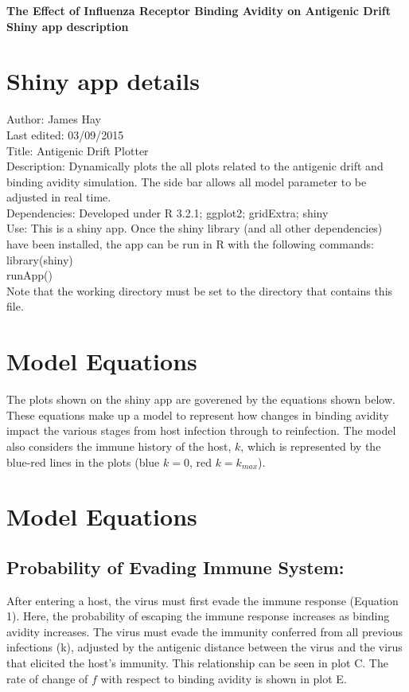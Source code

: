\documentclass[a4paper,11pt,twoside]{article}
\begin{document}
\begin{center}
  \textbf{\LARGE The Effect of Influenza Receptor Binding Avidity on Antigenic Drift}\\[.5cm]
  \textbf{\Large Shiny app description}\\[.5cm]
\end{center}

\section*{Shiny app details}
Author: James Hay\\
Last edited: 03/09/2015\\
Title: Antigenic Drift Plotter\\
Description: Dynamically plots the all plots related to the antigenic drift and binding avidity simulation. The side bar allows all model parameter to be adjusted in real time.\\
Dependencies: Developed under R 3.2.1; ggplot2; gridExtra; shiny\\

Use: This is a shiny app. Once the shiny library (and all other dependencies) have been installed, the app can be run in R with the following commands:\\

library(shiny)\\
runApp()\\

Note that the working directory must be set to the directory that contains this file.\\

\section*{Model Equations}
The plots shown on the shiny app are goverened by the equations shown below. These equations make up a model to represent how changes in binding avidity impact the various stages from host infection through to reinfection. The model also considers the immune history of the host, $k$, which is represented by the blue-red lines in the plots (blue $k=0$, red $k=k_{max}$).

\section*{Model Equations}
\subsection*{Probability of Evading Immune System:}
After entering a host, the virus must first evade the immune response (Equation 1). Here, the probability of escaping the immune response increases as binding avidity increases. The virus must evade the immunity conferred from all previous infections (k), adjusted by the antigenic distance between the virus and the virus that elicited the host's immunity. This relationship can be seen in plot C. The rate of change of $f$ with respect to binding avidity is shown in plot E.
\end{document}
